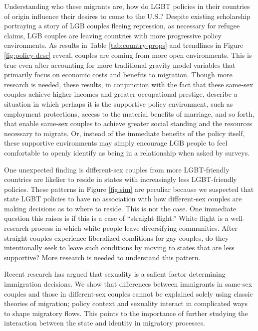 \documentclass[
  11pt,
]{article}
\begin{document}
Understanding who these migrants are, how do LGBT policies in their countries of origin influence their desires to come to the U.S.? Despite existing scholarship portraying a story of LGB couples fleeing repression, as necessary for refugee claims, LGB couples are leaving countries with more progressive policy environments. As results in Table \ref{tab:country-props} and trendlines in Figure \ref{fig:policy-desc} reveal, couples are coming from more open environments. This is true even after accounting for more traditional gravity model variables that primarily focus on economic costs and benefits to migration. Though more research is needed, these results, in conjunction with the fact that these same-sex couples achieve higher incomes and greater occupational prestige, describe a situation in which perhaps it is the supportive policy environment, such as employment protections, access to the material benefits of marriage, and so forth, that enable same-sex couples to achieve greater social standing and the resources necessary to migrate. Or, instead of the immediate benefits of the policy itself, these supportive environments may simply encourage LGB people to feel comfortable to openly identify as being in a relationship when asked by surveys.

One unexpected finding is different-sex couples from more LGBT-friendly countries are likelier to reside in states with increasingly less LGBT-friendly policies. These patterns in Figure \ref{fig:sim} are peculiar because we suspected that state LGBT policies to have no association with how different-sex couples are making decisions as to where to reside. This is not the case. One immediate question this raises is if this is a case of ``straight flight.'' White flight is a well-research process in which white people leave diversifying communities. After straight couples experience liberalized conditions for gay couples, do they intentionally seek to leave such conditions by moving to states that are less supportive? More research is needed to understand this pattern.

Recent research has argued that sexuality is a salient factor determining immigration decisions. We show that differences between immigrants in same-sex couples and those in different-sex couples cannot be explained solely using classic theories of migration; policy context and sexuality interact in complicated ways to shape migratory flows. This points to the importance of further studying the interaction between the state and identity in migratory processes.
\end{document}
